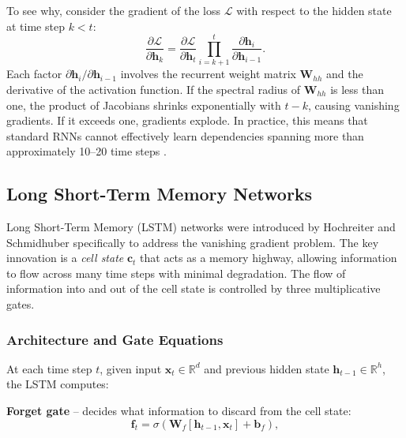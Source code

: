 To see why, consider the gradient of the loss $\mathcal{L}$ with respect to the hidden state at time step $k < t$:
\begin{equation}
    \frac{\partial \mathcal{L}}{\partial \mathbf{h}_k} = \frac{\partial \mathcal{L}}{\partial \mathbf{h}_t} \prod_{i=k+1}^{t} \frac{\partial \mathbf{h}_i}{\partial \mathbf{h}_{i-1}}.
    \label{eq:vanishing}
\end{equation}
Each factor $\partial \mathbf{h}_i / \partial \mathbf{h}_{i-1}$ involves the recurrent weight matrix $\mathbf{W}_{hh}$ and the derivative of the activation function. If the spectral radius of $\mathbf{W}_{hh}$ is less than one, the product of Jacobians shrinks exponentially with $t - k$, causing vanishing gradients. If it exceeds one, gradients explode. In practice, this means that standard RNNs cannot effectively learn dependencies spanning more than approximately 10--20 time steps \cite{bengio1994learning}.

\subsection{Long Short-Term Memory Networks}
\label{sec:lstm}

Long Short-Term Memory (LSTM) networks were introduced by Hochreiter and Schmidhuber \cite{hochreiter1997long} specifically to address the vanishing gradient problem. The key innovation is a \emph{cell state} $\mathbf{c}_t$ that acts as a memory highway, allowing information to flow across many time steps with minimal degradation. The flow of information into and out of the cell state is controlled by three multiplicative gates.

\subsubsection{Architecture and Gate Equations}

At each time step $t$, given input $\mathbf{x}_t \in \mathbb{R}^d$ and previous hidden state $\mathbf{h}_{t-1} \in \mathbb{R}^h$, the LSTM computes:

\textbf{Forget gate} -- decides what information to discard from the cell state:
\begin{equation}
    \mathbf{f}_t = \sigma(\mathbf{W}_f [\mathbf{h}_{t-1}, \mathbf{x}_t] + \mathbf{b}_f),
    \label{eq:forget_gate}
\end{equation}

